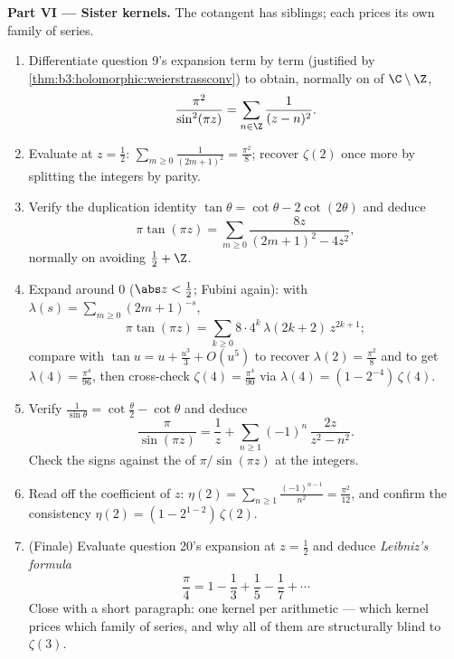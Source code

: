 \begin{problem}
\medskip
\noindent\textbf{Part VI --- Sister kernels.} The cotangent
has siblings; each prices its own family of series.
\begin{enumerate}[resume]
  \item Differentiate question 9's expansion term by term
        (justified by
        \cref{thm:b3:holomorphic:weierstrassconv}) to
        obtain, normally on  of $\C\setminus\Z$,
        \[
        \frac{\pi^2}{\sin^2(\pi z)} =
        \sum_{n\in\Z}\frac1{(z - n)^2} .
        \]
  \item Evaluate at $z = \frac12$:
        $\sum_{m\geq0}\frac1{(2m+1)^2} = \frac{\pi^2}8$;
        recover $\zeta(2)$ once more by splitting the
        integers by parity.
  \item Verify the duplication identity $\tan\theta =
        \cot\theta - 2\cot(2\theta)$ and deduce
        \[
        \pi\tan(\pi z) =
        \sum_{m\geq0}\frac{8z}{(2m+1)^2 - 4z^2} ,
        \]
        normally on  avoiding $\frac12 + \Z$.
  \item Expand around $0$ ($\abs z < \frac12$; Fubini
        again): with $\lambda(s) =
        \sum_{m\geq0}(2m+1)^{-s}$,
        \[
        \pi\tan(\pi z) =
        \sum_{k\geq0}8\cdot4^k\,\lambda(2k+2)\,z^{2k+1} ;
        \]
        compare with $\tan u = u + \frac{u^3}3 + O(u^5)$ to
        recover $\lambda(2) = \frac{\pi^2}8$ and to get
        $\lambda(4) = \frac{\pi^4}{96}$, then cross-check
        $\zeta(4) = \frac{\pi^4}{90}$ via $\lambda(4) = (1 -
        2^{-4})\,\zeta(4)$.
  \item Verify $\frac1{\sin\theta} = \cot\frac\theta2 -
        \cot\theta$ and deduce
        \[
        \frac{\pi}{\sin(\pi z)} = \frac1z +
        \sum_{n\geq1}(-1)^n\,\frac{2z}{z^2 - n^2} .
        \]
        Check the signs against the  of
        $\pi/\sin(\pi z)$ at the integers.
  \item Read off the coefficient of $z$: $\eta(2) =
        \sum_{n\geq1}\frac{(-1)^{n-1}}{n^2} =
        \frac{\pi^2}{12}$, and confirm the consistency
        $\eta(2) = (1 - 2^{1-2})\,\zeta(2)$.
  \item (Finale) Evaluate question 20's expansion at $z =
        \frac12$ and deduce \emph{Leibniz's formula}
        \[
        \frac\pi4 = 1 - \frac13 + \frac15 - \frac17 +
        \cdots
        \]
        Close with a short paragraph: one kernel per
        arithmetic --- which kernel prices which family of
        series, and why all of them are structurally blind
        to $\zeta(3)$.


\end{enumerate}
\end{problem}
